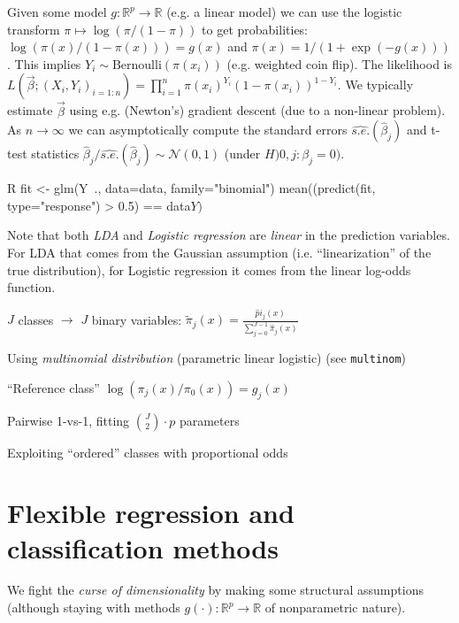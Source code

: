 \begin{sectionbox}\nospacing{}
  Given some model $g: \mathbb{R}^p \to \mathbb{R}$ (e.g. a linear model) we can use the logistic transform $\pi \mapsto \log(\pi/(1-\pi))$ to get probabilities: $\log(\pi(x)/(1-\pi(x))) = g(x)$ and $\pi(x) = 1/(1+\exp{(-g(x))})$.
  This implies $Y_i \sim \text{Bernoulli}(\pi(x_i))$ (e.g. weighted coin flip). The likelihood is $L(\vec{\beta}; (X_i,Y_i)_{i=1:n}) = \prod_{i=1}^n\pi(x_i)^{Y_i}(1-\pi(x_i))^{1-Y_i}$.
  We typically estimate $\vec{\beta}$ using e.g. (Newton's) gradient descent (due to a non-linear problem).
  As $n\to \infty$ we can asymptotically compute the standard errors $\widehat{s.e.}(\hat{\beta}_j)$ and t-test statistics $\hat\beta_j/\widehat{s.e.}(\hat\beta_j) \sim \mathcal{N}(0,1)$ (under $H){0,j}: \beta_j=0)$.
  \begin{mintlinebox}{R}
    fit <- glm(Y~., data=data, family="binomial")
    mean((predict(fit, type="response") > 0.5) == data$Y)$
  \end{mintlinebox}
\end{sectionbox}

\begin{notebox}\nospacing{}
  Note that both \emph{LDA} and \emph{Logistic regression} are \emph{linear} in the prediction variables.
  For LDA that comes from the Gaussian assumption (i.e. ``linearization'' of the true distribution), for Logistic regression it comes from the linear log-odds function.
\end{notebox}
\begin{notebox}\nospacing{}
  \begin{enumeratenosep}
  \item $J$ classes $\rightarrow$ $J$ binary variables: $\tilde \pi_j(x) = \frac{\hat pi_j(x)}{\sum_{j=0}^{J-1}\hat\pi_j(x)}$
  \item Using \emph{multinomial distribution} (parametric linear logistic) (see \verb!multinom!)
  \item ``Reference class'' $\log(\pi_j(x)/\pi_0(x)) = g_j(x)$
  \item Pairwise 1-vs-1, fitting ${J \choose 2}\cdot p$ parameters
  \item Exploiting ``ordered'' classes with proportional odds
  \end{enumeratenosep}
\end{notebox}


\section{Flexible regression and classification methods}\label{sec:flexible_regression_and_classification_methods}
We fight the \emph{curse of dimensionality} by making some structural assumptions (although staying with methods $g(\cdot): \mathbb{R}^p \to \mathbb{R}$ of nonparametric nature).
